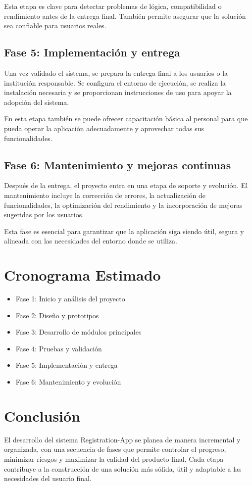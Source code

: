 \documentclass[11pt,a4paper]{article}
\begin{document}
	Esta etapa es clave para detectar problemas de lógica, compatibilidad o rendimiento antes de la entrega final. También permite asegurar que la solución sea confiable para usuarios reales.
	
	\subsection{Fase 5: Implementación y entrega}
	Una vez validado el sistema, se prepara la entrega final a los usuarios o la institución responsable. Se configura el entorno de ejecución, se realiza la instalación necesaria y se proporcionan instrucciones de uso para apoyar la adopción del sistema.\par
	
	En esta etapa también se puede ofrecer capacitación básica al personal para que pueda operar la aplicación adecuadamente y aprovechar todas sus funcionalidades.
	
	\subsection{Fase 6: Mantenimiento y mejoras continuas}
	Después de la entrega, el proyecto entra en una etapa de soporte y evolución. El mantenimiento incluye la corrección de errores, la actualización de funcionalidades, la optimización del rendimiento y la incorporación de mejoras sugeridas por los usuarios.\par
	
	Esta fase es esencial para garantizar que la aplicación siga siendo útil, segura y alineada con las necesidades del entorno donde se utiliza.
	
	\section{Cronograma Estimado}
	\begin{itemize}[leftmargin=1.5em]
		\item Fase 1: Inicio y análisis del proyecto
		\item Fase 2: Diseño y prototipos
		\item Fase 3: Desarrollo de módulos principales
		\item Fase 4: Pruebas y validación
		\item Fase 5: Implementación y entrega
		\item Fase 6: Mantenimiento y evolución
	\end{itemize}
	
	\section{Conclusión}
	El desarrollo del sistema Registration-App se planea de manera incremental y organizada, con una secuencia de fases que permite controlar el progreso, minimizar riesgos y maximizar la calidad del producto final. Cada etapa contribuye a la construcción de una solución más sólida, útil y adaptable a las necesidades del usuario final.
	
\end{document}
